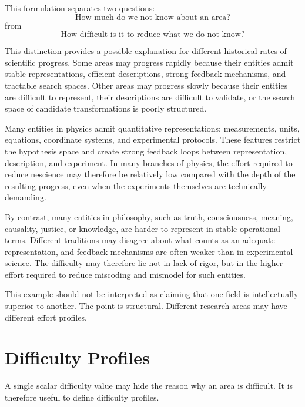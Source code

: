 This formulation separates two questions:
\[
\text{How much do we not know about an area?}
\]
from
\[
\text{How difficult is it to reduce what we do not know?}
\]

This distinction provides a possible explanation for different historical rates of scientific progress. Some areas may progress rapidly because their entities admit stable representations, efficient descriptions, strong feedback mechanisms, and tractable search spaces. Other areas may progress slowly because their entities are difficult to represent, their descriptions are difficult to validate, or the search space of candidate transformations is poorly structured.

\begin{example}
Many entities in physics admit quantitative representations: measurements, units, equations, coordinate systems, and experimental protocols. These features restrict the hypothesis space and create strong feedback loops between representation, description, and experiment. In many branches of physics, the effort required to reduce nescience may therefore be relatively low compared with the depth of the resulting progress, even when the experiments themselves are technically demanding.

By contrast, many entities in philosophy, such as truth, consciousness, meaning, causality, justice, or knowledge, are harder to represent in stable operational terms. Different traditions may disagree about what counts as an adequate representation, and feedback mechanisms are often weaker than in experimental science. The difficulty may therefore lie not in lack of rigor, but in the higher effort required to reduce miscoding and mismodel for such entities.
\end{example}

This example should not be interpreted as claiming that one field is intellectually superior to another. The point is structural. Different research areas may have different effort profiles.

\section{Difficulty Profiles}
\label{sec:difficulty_profiles}

A single scalar difficulty value may hide the reason why an area is difficult. It is therefore useful to define difficulty profiles.

